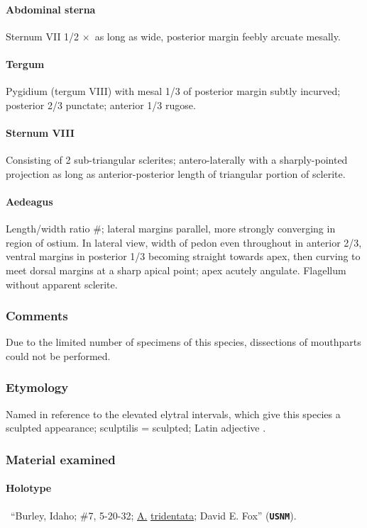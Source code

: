 \documentclass[fleqn,10pt,lineno]{wlpeerj} %
\newcommand{\x}{$\times$~}
\begin{document}
			\paragraph{Abdominal sterna}
				Sternum VII 1/2 \x as long as wide, posterior margin feebly arcuate mesally.
			\paragraph{Tergum}
				Pygidium (tergum VIII) with mesal 1/3 of posterior margin subtly incurved; posterior 2/3 punctate; anterior 1/3 rugose.
			\paragraph{Sternum VIII}
				Consisting of 2 sub-triangular sclerites; antero-laterally with a sharply-pointed projection as long as anterior-posterior length of triangular portion of sclerite.
			\paragraph{Aedeagus}
				Length/width ratio \#; lateral margins parallel, more strongly converging in region of ostium. 
				In lateral view, width of pedon even throughout in anterior 2/3, ventral margins in posterior 1/3 becoming straight towards apex, then curving to meet dorsal margins at a sharp apical point; apex acutely angulate. 
				Flagellum without apparent sclerite.
		\subsubsection*{Comments}
			Due to the limited number of specimens of this species, dissections of mouthparts could not be performed.
		\subsubsection*{Etymology}
			Named in reference to the elevated elytral intervals, which give this species a sculpted appearance; sculptilis = sculpted; Latin adjective \citep{brown1956}.
		\subsubsection*{Material examined}
			\paragraph{Holotype}
				\female~``Burley, Idaho; \#7, 5-20-32; \underline{A.} \underline{tridentata}; David E. Fox'' (\texttt{\textbf{USNM}}).
\end{document}
